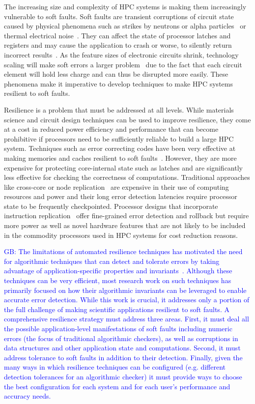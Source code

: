\documentclass{sig-alternate}
\newcommand{\greg}[1]{%
  \textcolor{blue}{GB: #1}
}
\begin{document}
The increasing size and complexity of HPC systems is making them increasingly vulnerable to soft faults.
Soft faults are transient corruptions of circuit state caused by physical phenomena such as strikes by neutrons or alpha particles~\cite{baumann:2005, asciQSER:2005} or thermal electrical noise~\cite{therm_noise:2007}.
They can affect the state of processor latches and registers and may cause the application to crash or worse, to silently return incorrect results~\cite{mpi_ser:reed:2004}.
As the feature sizes of electronic circuits shrink, technology scaling will make soft errors a larger problem~\cite{err_scaling:2012} due to the fact that each circuit element will hold less charge and can thus be disrupted more easily.
These phenomena make it imperative to develop techniques to make HPC systems resilient to soft faults.

Resilience is a problem that must be addressed at all levels.
While materials science and circuit design techniques can be used to improve resilience, they come at a cost in reduced power efficiency and performance that can become prohibitive if processors need to be sufficiently reliable to build a large HPC system.
Techniques such as error correcting codes have been very effective at making memories and caches resilient to soft faults~\cite{mem_errors:2010}.
However, they are more expensive for protecting core-internal state such as latches and are significantly less effective for checking the correctness of computations.
Traditional approaches like cross-core or node replication~\cite{rmpi:2011, dyn_cmp_repl:2007} are expensive in their use of computing resources and power and their long error detection latencies require processor state to be frequently checkpointed.
Processor designs that incorporate instruction replication~\cite{repl_smt:2000} offer fine-grained error detection and rollback but require more power as well as novel hardware features that are not likely to be included in the commodity processors used in HPC systems for cost reduction reasons.

\greg{The limitations of automated resilience techniques has motivated the need for algorithmic techniques that can detect and tolerate errors by taking advantage of application-specific properties and invariants~\cite{amg_abft:2012, robustification:2010, abft:1984}.
Although these techniques can be very efficient, most research work on such techniques has primarily focused on how their algorithmic invariants can be leveraged to enable accurate error detection.
While this work is crucial, it addresses only a portion of the full challenge of making scientific applications resilient to soft faults.
A comprehensive resilience strategy must address three areas.
First, it must deal all the possible application-level manifestations of soft faults including numeric errors (the focus of traditional algorithmic checkers), as well as corruptions in data structures and other application state and computations.
Second, it must address tolerance to soft faults in addition to their detection.
Finally, given the many ways in which resilience techniques can be configured (e.g. different detection tolerances for an algorithmic checker) it must provide ways to choose the best configuration for each system and for each user's performance and accuracy needs.}
\end{document}
